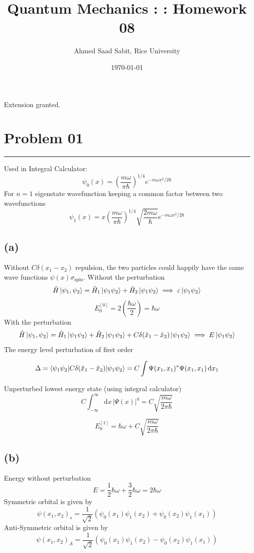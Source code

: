 \documentclass[letter, 10pts]{article}
\title{Quantum Mechanics : : Homework 08}
\author{Ahmed Saad Sabit, Rice University}
\date{\today}
\newcommand{\hb}{\hbar}
\begin{document}
\maketitle

Extension granted. 

\section*{Problem 01}
\hrule
Used in Integral Calculator: 
\[
	\psi_0(x) = \left(\frac{ m \omega}{ \pi \hb } \right) ^{ 1 / 4} e^{ - m \omega x^2 /  2 \hb }
\]
For $n = 1$ eigenstate wavefunction keeping a common factor between two wavefunctions
\[
	\psi_1(x) = x \left(\frac{ m \omega}{ \pi \hb } \right) ^{ 1 / 4} \sqrt{\frac{2 m \omega }{\hb } } e^{ - m \omega x^2 /  2 \hb }
\] 
\subsection*{(a)}
Without $C \delta(x_1 - x_2)$ repulsion, the two particles could happily have the same wave functions $\psi(x) \sigma_\text{spin}$. Without the perturbation 
\[
\hat{H} \ket{\psi_1 , \psi_2} = \hat{H}_1 \ket{\psi_1 \psi_2} + \hat{H}_2 \ket{\psi_1\psi_2}  \implies \varepsilon \ket{\psi_1 \psi_2}
\]
\[
E_0 ^{[0] } = 2 \left(\frac{\hb \omega }{2 }\right) = \hb \omega 
\] 
With the perturbation
\[
\hat{H} \ket{\psi_1 , \psi_2} = \hat{H}_1 \ket{\psi_1 \psi_2} + \hat{H}_2 \ket{\psi_1\psi_2} + C \delta(\hat x_1 - \hat x_2) \ket{\psi_1 \psi_2} \implies E \ket{\psi_1 \psi_2}
\]
The energy level perturbation of first order


\[
\Delta = \braket{\psi_1 \psi_2 | C \delta( \hat x_1 -  \hat{ x }_2) | \psi_1 \psi_2} = C
\int \Psi(x_1, x_1) ^{*} \Psi(x_1, x_1) \, \mathrm{d} x_1
\] 

Unperturbed lowest energy state (using integral calculator)
\[
C \int_{-\infty}^{\infty} \mathrm{d} x \, | \Psi(x) | ^{4}
= 
C \sqrt{\frac{m \omega}{2 \pi \hb}} 
\] 

\[
\boxed{
	E_0 ^{[1]} = \hb \omega + C \sqrt{\frac{m \omega}{2 \pi \hb}} 
}
\] 



\subsection*{(b)} 
Energy without perturbation
\[
E = \frac{1}{2} \hb \omega + \frac{3}{2} \hb \omega = 2 \hb \omega 
\] 
Symmetric orbital is given by 
\[
\psi(x_1 , x_2) _s = \frac{1}{\sqrt{2} } 
\left(
\psi_0(x_1) \psi_1(x_2) + \psi_0 (x_2) \psi_1 (x_1)
\right)
\] 
Anti-Symmetric orbital is given by 
\[
\psi(x_1 , x_2) _A = \frac{1}{\sqrt{2} } 
\left(
\psi_0(x_1) \psi_1(x_2) - \psi_0 (x_2) \psi_1 (x_1)
\right)
\] 
\end{document}
